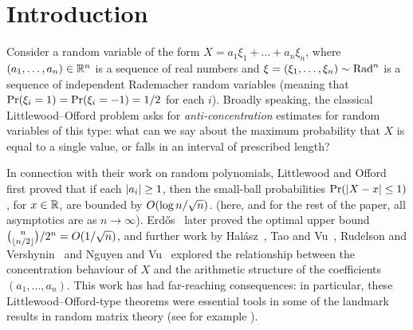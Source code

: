 \documentclass{daj}
\theoremstyle{plain}
\theoremstyle{plain}
\theoremstyle{plain}
\theoremstyle{plain}
\theoremstyle{definition}
\theoremstyle{plain}
\theoremstyle{plain}
\theoremstyle{definition}
\theoremstyle{definition}
\theoremstyle{plain}
\let\originalleft\left
\let\originalright\right
\renewcommand{\left}{\mathopen{}\mathclose\bgroup\originalleft}
\renewcommand{\right}{\aftergroup\egroup\originalright}
\begin{document}
\begin{frontmatter}[classification=text]
\begin{abstract}
\noindent Consider a quadratic polynomial $f\left(\xi_{1},\dots,\xi_{n}\right)$
of independent Bernoulli random variables. What can be said about
the concentration of $f$ on any single value? This generalises the
classical Littlewood--Offord problem, which asks the same question
for linear polynomials. As in the linear case, it is known that the point probabilities of $f$ can be as large as about $1/\sqrt{n}$, but still poorly understood is the ``inverse'' question of characterising the algebraic and arithmetic features $f$ must have if it has point probabilities comparable to this bound. In this paper we prove some results
of an algebraic flavour, showing that if $f$ has point probabilities
much larger than $1/n$ then it must be close to a quadratic form with low rank. We also give an application to Ramsey graphs, asymptotically answering a question of Kwan, Sudakov and Tran.
\end{abstract}
\end{frontmatter}

\section{Introduction}

Consider a random variable of the form $X=a_{1}\xi_{1}+\dots+a_{n}\xi_{n}$,
where $(a_{1},\dots,a_{n})\in\mathbb{R}^{n}$ is
a sequence of real numbers and $\xi=(\xi_{1},\dots,\xi_{n})\sim\operatorname{Rad}^{n}$
is a sequence of independent Rademacher random variables (meaning that
$\Pr\left(\xi_{i}=1\right)=\Pr\left(\xi_{i}=-1\right)=1/2$ for each
$i$). Broadly speaking, the classical Littlewood--Offord problem
asks for \emph{anti-concentration} estimates for random variables
of this type: what can we say about the maximum probability that $X$
is equal to a single value, or falls in an interval of prescribed
length?

In connection with their work on random polynomials, Littlewood and
Offord~\cite{LO43} first proved that if each $\left|a_{i}\right|\ge1$,
then the small-ball probabilities $\Pr\left(\left|X-x\right|\le1\right)$,
for $x\in\mathbb{R}$, are bounded by $O\left(\log n/\sqrt{n}\right)$. (here,
and for the rest of the paper, all asymptotics are as $n\to\infty$).
Erd\H os~\cite{Erd45} later proved the optimal upper bound $\binom{n}{\floor{n/2}}/2^{n}=O\left(1/\sqrt{n}\right)$,
and further work by Hal\'asz~\cite{Hal77}, Tao and Vu~\cite{TV10,TV09b},
Rudelson and Vershynin~\cite{RV08} and Nguyen and Vu~\cite{NV11}
explored the relationship between the concentration behaviour of $X$
and the arithmetic structure of the coefficients $(a_{1},\dots,a_{n})$. This work has had
far-reaching consequences: in particular, these Littlewood--Offord-type
theorems were essential tools in some of the landmark results in random
matrix theory (see for example \cite{TV09a,TV09b,Tik18}).
\end{document}
